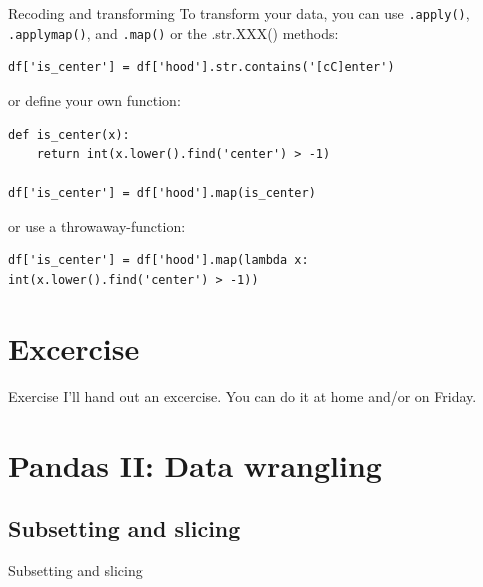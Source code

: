 \documentclass{beamer}
\begin{document}
\begin{frame}[fragile]{Recoding and transforming}
To transform your data, you can use \texttt{.apply()}, \texttt{.applymap()}, and \texttt{.map()} or the .str.XXX() methods:

\begin{lstlisting}
df['is_center'] = df['hood'].str.contains('[cC]enter')
\end{lstlisting}
or define your own function:
\begin{lstlisting}
def is_center(x):
    return int(x.lower().find('center') > -1)
    
df['is_center'] = df['hood'].map(is_center)
\end{lstlisting}
or use a throwaway-function:
\begin{lstlisting}
df['is_center'] = df['hood'].map(lambda x: int(x.lower().find('center') > -1))
\end{lstlisting}


\end{frame}



\section{Excercise}
\begin{frame}{Exercise}
I'll hand out an excercise. You can do it at home and/or on Friday.
\end{frame}


\section{Pandas II: Data wrangling}
\subsection{Subsetting and slicing}

\begin{frame}[plain]
Subsetting and slicing
\end{frame}
\end{document}

